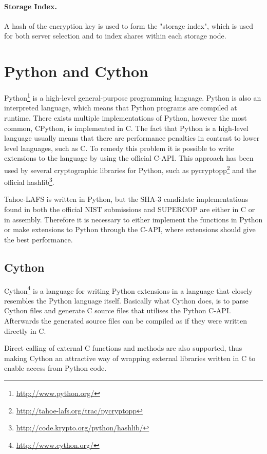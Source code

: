\documentclass[english,12pt,a4paper]{book}
\begin{document}
\paragraph{Storage Index.}

A hash of the encryption key is used to form the "storage index", which is
used for both server selection and to index shares within each storage node.

\section{Python and Cython}

Python\footnote{\url{http://www.python.org/}} is a high-level general-purpose
programming language. Python is also an interpreted language, which means that
Python programs are compiled at runtime. There exists multiple implementations
of Python, however the most common, CPython, is implemented in C. The fact that
Python is a high-level language usually means that there are performance
penalties in contrast to lower level languages, such as C. To remedy this
problem it is possible to write extensions to the language by using the official
C-API. This approach has been used by several cryptographic libraries for
Python, such as pycryptopp\footnote{\url{http://tahoe-lafs.org/trac/pycryptopp}}
and the official hashlib\footnote{\url{http://code.krypto.org/python/hashlib/}}.

Tahoe-\ac{LAFS} is written in Python, but the SHA-3 candidate implementations found
in both the official NIST submissions and SUPERCOP are either in C or in
assembly. Therefore it is necessary to either implement the functions in Python
or make extensions to Python through the C-API, where extensions should give
the best performance.

\subsection{Cython}
Cython\footnote{\url{http://www.cython.org/}} is a language for writing Python
extensions in a language that closely resembles the Python language itself.
Basically what Cython does, is to parse Cython files and generate C source files
that utilises the Python C-API. Afterwards the generated source files can be
compiled as if they were written directly in C.

Direct calling of external C functions and methods are also supported, thus
making Cython an attractive way of wrapping external libraries written in C to
enable access from Python code.
\end{document}
